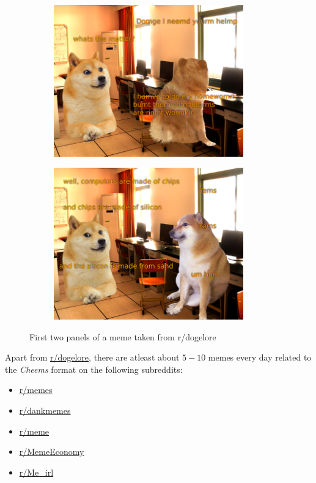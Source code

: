 \def\DevnagVersion{2.17}\documentclass{article}
\begin{document}
\begin{figure}[H]
    \centering
    \begin{subfigure}{0.45\textwidth}
        \centering
        \includegraphics[width=0.9\textwidth]{figures/reddit_1.png}
    \end{subfigure}
    \begin{subfigure}{0.45\textwidth}
        \centering
        \includegraphics[width=0.9\textwidth]{figures/reddit_2.png}
    \end{subfigure}
    \caption{First two panels of a meme taken from r/dogelore}
\end{figure}

Apart from \href{https://www.reddit.com/r/dogelore}{r/dogelore}, there are atleast about $5-10$ memes every day related to the \textit{Cheems} format on the following subreddits:
\begin{itemize}
    \item \href{https://www.reddit.com/r/memes}{r/memes}
    \item \href{https://www.reddit.com/r/dankmemes}{r/dankmemes}
    \item \href{https://www.reddit.com/r/meme}{r/meme}
    \item \href{https://www.reddit.com/com/r/memeeconomy}{r/MemeEconomy}
    \item \href{https://www.reddit.com/r/Me_irl}{r/Me\_irl}
\end{itemize}
\end{document}
